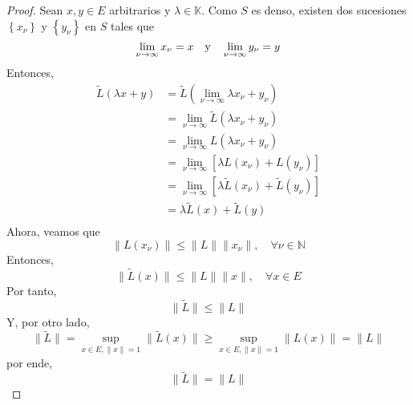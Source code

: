 \documentclass[12pt]{report}
\theoremstyle{largebreak}
\renewcommand{\leq}{\ensuremath{\leqslant}}
\renewcommand{\geq}{\ensuremath{\geqslant}}
\newcommand\norm[1]{\ensuremath{\|#1\|}}
\begin{document}
    \begin{proof}
        Sean $x,y\in E$ arbitrarios y $\lambda\in\mathbb{K}$. Como $S$ es denso, existen dos sucesiones $\left\{x_\nu\right\}$ y $\left\{y_\nu\right\}$ en $S$ tales que
        \begin{equation*}
            \lim_{\nu\rightarrow\infty}x_\nu=x\quad\textup{y}\quad\lim_{\nu\rightarrow\infty}y_\nu=y
        \end{equation*}
        Entonces,
        \begin{equation*}
            \begin{split}
                \tilde{L}(\lambda x+y)&=\tilde{L}\left(\lim_{\nu\rightarrow\infty}\lambda x_\nu+y_\nu \right)\\
                &=\lim_{\nu\rightarrow\infty}\tilde{L}\left(\lambda x_\nu+y_\nu \right)\\
                &=\lim_{\nu\rightarrow\infty}L\left(\lambda x_\nu+y_\nu \right)\\
                &=\lim_{\nu\rightarrow\infty}\left[\lambda L(x_\nu)+L(y_\nu)\right]\\
                &=\lim_{\nu\rightarrow\infty}\left[\lambda\tilde{L}(x_\nu)+\tilde{L}(y_\nu)\right]\\
                &=\lambda\tilde{L}(x)+\tilde{L}(y)\\
            \end{split}
        \end{equation*}
        Ahora, veamos que
        \begin{equation*}
            \norm{L(x_\nu)}\leq\norm{L}\norm{x_\nu},\quad\forall \nu\in\mathbb{N}
        \end{equation*}
        Entonces,
        \begin{equation*}
            \norm{\tilde{L}(x)}\leq\norm{L}\norm{x},\quad\forall x\in E
        \end{equation*}
        Por tanto,
        \begin{equation*}
            \norm{\tilde{L}}\leq\norm{L}
        \end{equation*}
        Y, por otro lado,
        \begin{equation*}
            \norm{\tilde{L}}=\sup_{x\in E,\norm{x}=1}\norm{\tilde{L}(x)}\geq\sup_{ x\in E,\norm{x}=1}\norm{L(x)}=\norm{L}
        \end{equation*}
        por ende,
        \begin{equation*}
            \norm{\tilde{L}}=\norm{L}
        \end{equation*}
    \end{proof}
\end{document}
